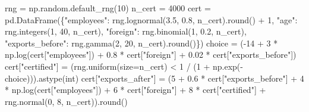 \documentclass[
  letterpaper,
  10pt,
  twoside,
  openright,
  numbers=noenddot,
  chapterprefix=true]{scrbook}
\newenvironment{Shaded}{}{}
\newcommand{\BuiltInTok}[1]{\textcolor[rgb]{0.84,0.23,0.29}{#1}}
\newcommand{\DecValTok}[1]{\textcolor[rgb]{0.00,0.36,0.77}{#1}}
\newcommand{\FloatTok}[1]{\textcolor[rgb]{0.00,0.36,0.77}{#1}}
\newcommand{\NormalTok}[1]{\textcolor[rgb]{0.14,0.16,0.18}{#1}}
\newcommand{\OperatorTok}[1]{\textcolor[rgb]{0.14,0.16,0.18}{#1}}
\newcommand{\StringTok}[1]{\textcolor[rgb]{0.01,0.18,0.38}{#1}}
\begin{document}
\label{check-cert-data}
\begin{Shaded}
\begin{Highlighting}[]
\NormalTok{rng }\OperatorTok{=}\NormalTok{ np.random.default\_rng(}\DecValTok{10}\NormalTok{)}
\NormalTok{n\_cert }\OperatorTok{=} \DecValTok{4000}
\NormalTok{cert }\OperatorTok{=}\NormalTok{ pd.DataFrame(\{}\StringTok{"employees"}\NormalTok{: rng.lognormal(}\FloatTok{3.5}\NormalTok{, }\FloatTok{0.8}\NormalTok{, n\_cert).}\BuiltInTok{round}\NormalTok{() }\OperatorTok{+} \DecValTok{1}\NormalTok{,}
                     \StringTok{"age"}\NormalTok{: rng.integers(}\DecValTok{1}\NormalTok{, }\DecValTok{40}\NormalTok{, n\_cert),}
                     \StringTok{"foreign"}\NormalTok{: rng.binomial(}\DecValTok{1}\NormalTok{, }\FloatTok{0.2}\NormalTok{, n\_cert),}
                     \StringTok{"exports\_before"}\NormalTok{: rng.gamma(}\DecValTok{2}\NormalTok{, }\DecValTok{20}\NormalTok{, n\_cert).}\BuiltInTok{round}\NormalTok{()\})}
\NormalTok{choice }\OperatorTok{=}\NormalTok{ (}\OperatorTok{{-}}\DecValTok{14} \OperatorTok{+} \DecValTok{3} \OperatorTok{*}\NormalTok{ np.log(cert[}\StringTok{"employees"}\NormalTok{]) }\OperatorTok{+} \FloatTok{0.8} \OperatorTok{*}\NormalTok{ cert[}\StringTok{"foreign"}\NormalTok{]}
          \OperatorTok{+} \FloatTok{0.02} \OperatorTok{*}\NormalTok{ cert[}\StringTok{"exports\_before"}\NormalTok{])}
\NormalTok{cert[}\StringTok{"certified"}\NormalTok{] }\OperatorTok{=}\NormalTok{ (rng.uniform(size}\OperatorTok{=}\NormalTok{n\_cert) }\OperatorTok{\textless{}} \DecValTok{1} \OperatorTok{/}\NormalTok{ (}\DecValTok{1} \OperatorTok{+}\NormalTok{ np.exp(}\OperatorTok{{-}}\NormalTok{choice))).astype(}\BuiltInTok{int}\NormalTok{)}
\NormalTok{cert[}\StringTok{"exports\_after"}\NormalTok{] }\OperatorTok{=}\NormalTok{ (}\DecValTok{5} \OperatorTok{+} \FloatTok{0.6} \OperatorTok{*}\NormalTok{ cert[}\StringTok{"exports\_before"}\NormalTok{] }\OperatorTok{+} \DecValTok{4} \OperatorTok{*}\NormalTok{ np.log(cert[}\StringTok{"employees"}\NormalTok{])}
                         \OperatorTok{+} \DecValTok{6} \OperatorTok{*}\NormalTok{ cert[}\StringTok{"foreign"}\NormalTok{] }\OperatorTok{+} \DecValTok{8} \OperatorTok{*}\NormalTok{ cert[}\StringTok{"certified"}\NormalTok{]}
                         \OperatorTok{+}\NormalTok{ rng.normal(}\DecValTok{0}\NormalTok{, }\DecValTok{8}\NormalTok{, n\_cert)).}\BuiltInTok{round}\NormalTok{()}


\end{Highlighting}
\end{Shaded}
\end{document}
